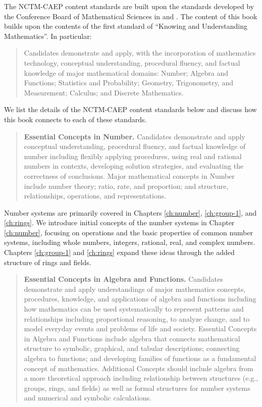 \documentclass[
]{book}
\theoremstyle{definition}
\theoremstyle{definition}
\theoremstyle{definition}
\theoremstyle{definition}
\theoremstyle{remark}
\begin{document}
The NCTM-CAEP content standards are built upon the standards developed by the Conference Board of Mathematical Sciences in \citeyearpar{MET1} and \citeyearpar{MET2}. The content of this book builds upon the contents of the first standard of ``Knowing and Understanding Mathematics''. In particular:

\begin{quote}
Candidates demonstrate and apply, with the incorporation of mathematics technology, conceptual understanding, procedural fluency, and factual knowledge of major mathematical domains: Number; Algebra and Functions; Statistics and Probability; Geometry, Trigonometry, and Measurement; Calculus; and Discrete Mathematics.
\end{quote}

We list the details of the NCTM-CAEP content standards below and discuss how this book connects to each of these standards.

\begin{quote}
\textbf{Essential Concepts in Number.} Candidates demonstrate and apply conceptual understanding, procedural fluency, and factual knowledge of number including flexibly applying procedures, using real and rational numbers in contexts, developing solution strategies, and evaluating the correctness of conclusions. Major mathematical concepts in Number include number theory; ratio, rate, and proportion; and structure, relationships, operations, and representations.
\end{quote}

Number systems are primarily covered in Chapters \ref{ch:number}, \ref{ch:group-1}, and \ref{ch:rings}. We introduce initial concepts of the number systems in Chapter \ref{ch:number}, focusing on operations and the basic properties of common number systems, including whole numbers, integers, rational, real, and complex numbers. Chapters \ref{ch:group-1} and \ref{ch:rings} expand these ideas through the added structure of rings and fields.

\begin{quote}
\textbf{Essential Concepts in Algebra and Functions.} Candidates demonstrate and apply understandings of major mathematics concepts, procedures, knowledge, and applications of algebra and functions including how mathematics can be used systematically to represent patterns and relationships including proportional reasoning, to analyze change, and to model everyday events and problems of life and society. Essential Concepts in Algebra and Functions include algebra that connects mathematical structure to symbolic, graphical, and tabular descriptions; connecting algebra to functions; and developing families of functions as a fundamental concept of mathematics. Additional Concepts should include algebra from a more theoretical approach including relationship between structures (e.g., groups, rings, and fields) as well as formal structures for number systems and numerical and symbolic calculations.
\end{quote}
\end{document}
